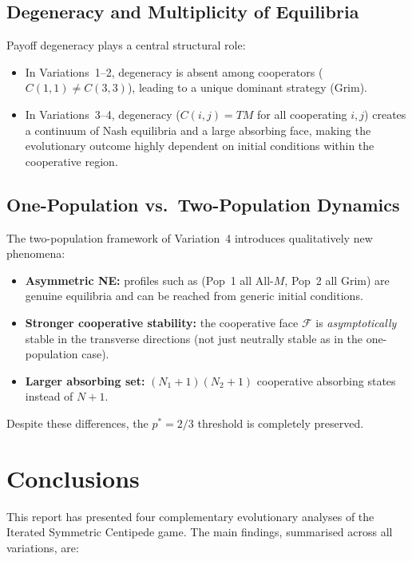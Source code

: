\documentclass[12pt,a4paper]{article}
\begin{document}
\subsection{Degeneracy and Multiplicity of Equilibria}

Payoff degeneracy plays a central structural role:
\begin{itemize}
  \item In Variations~1--2, degeneracy is absent among cooperators
        ($C(1,1) \neq C(3,3)$), leading to a unique dominant strategy (Grim).
  \item In Variations~3--4, degeneracy ($C(i,j)=TM$ for all cooperating $i,j$)
        creates a continuum of Nash equilibria and a large absorbing face,
        making the evolutionary outcome highly dependent on initial conditions
        within the cooperative region.
\end{itemize}

\subsection{One-Population vs.\ Two-Population Dynamics}

The two-population framework of Variation~4 introduces qualitatively new
phenomena:
\begin{itemize}
  \item \textbf{Asymmetric NE:} profiles such as (Pop~1 all All-$M$, Pop~2 all
        Grim) are genuine equilibria and can be reached from generic initial
        conditions.
  \item \textbf{Stronger cooperative stability:} the cooperative face $\mathcal{F}$
        is \emph{asymptotically} stable in the transverse directions (not just
        neutrally stable as in the one-population case).
  \item \textbf{Larger absorbing set:} $(N_1+1)(N_2+1)$ cooperative absorbing
        states instead of $N+1$.
\end{itemize}
Despite these differences, the $p^*=2/3$ threshold is completely preserved.

\section{Conclusions}
\label{sec:conclusions}

This report has presented four complementary evolutionary analyses of the
Iterated Symmetric Centipede game. The main findings, summarised across all
variations, are:
\end{document}
